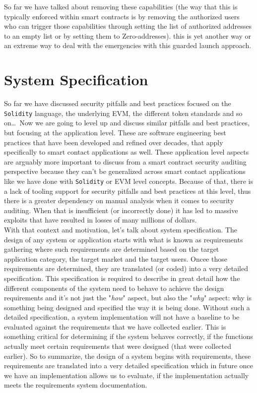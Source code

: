 So far we have talked about removing these capabilities (the way that this is typically enforced within smart contracts is by removing the authorized users who can trigger those capabilities through setting the list of authorized addresses to an empty list or by setting them to Zero-addresses). this is yet another way or an extreme way to deal with the emergencies with this guarded launch approach.

\section{System Specification}
So far we have discussed security pitfalls and best practices focused on the \verb|Solidity| language, the underlying EVM, the different token standards and so on\dots\, Now we are going to level up and discuss similar pitfalls and best practices, but focusing at the application level. These are software engineering best practices that have been developed and refined over decades, that apply specifically to smart contact applications as well. These application level aspects are arguably more important to discuss from a smart contract security auditing perspective because they can't be generalized across smart contact applications like we have done with \verb|Solidity| or EVM level concepts. Because of that, there is a lack of tooling support for security pitfalls and best practices at this level, thus there is a greater dependency on manual analysis when it comes to security auditing. When that is insufficient (or incorrectly done) it has led to massive exploits that have resulted in losses of many millions of dollars.\\

With that context and motivation, let's talk about system specification. The design of any system or application starts with what is known as requirements gathering where such requirements are determined based on the target application category, the target market and the target users. Oncee those requirements are determined, they are translated (or coded) into a very detailed specification. This specification is required to describe in great detail how the different components of the system need to behave to achieve the design requirements and it's not just the "\textit{how}" aspect, but also the "\textit{why}" aspect: why is something being designed and specified the way it is being done. Without such a detailed specification, a system implementation will not have a baseline to be evaluated against the requirements that we have collected earlier. This is something critical for determining if the system behaves correctly, if the functions actually meet certain requirements that were designed (that were collected earlier). So to summarize, the design of a system begins with requirements, these requirements are translated into a very detailed specification which in future once we have an implementation allows us to evaluate, if the implementation actually meets the requirements system documentation.

